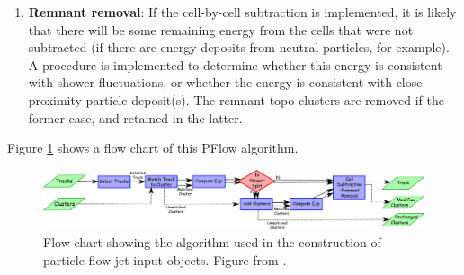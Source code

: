 \begin{enumerate}
    \item \textbf{Remnant removal}: If the cell-by-cell subtraction is implemented, it is likely that there will be some remaining energy from the cells that were not subtracted (if there are energy deposits from neutral particles, for example). A procedure is implemented to determine whether this energy is consistent with shower fluctuations, or whether the energy is consistent with close-proximity particle deposit(s). The remnant topo-clusters are removed if the former case, and retained in the latter.
\end{enumerate}
Figure \ref{fig:pflow} shows a flow chart of this PFlow algorithm.
\begin{figure}[t]
\includegraphics[width=\textwidth]{plots/atlas/pflow.pdf}
\caption{Flow chart showing the algorithm used in the construction of particle flow jet input objects. Figure from \cite{Atlas:PFlow}.\label{fig:pflow}}
\end{figure}

